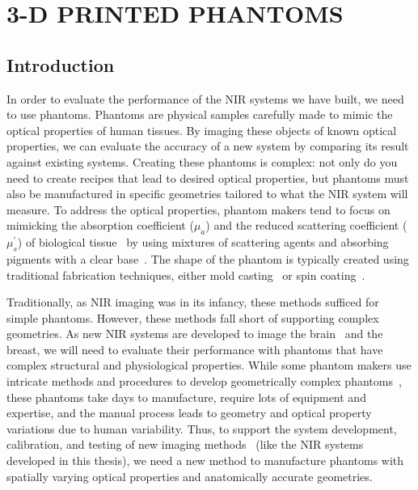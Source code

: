 
\chapter{3-D PRINTED PHANTOMS} %
\label{chap:3dprint}

\section{Introduction}
In order to evaluate the performance of the \ac{NIR} systems we have built, we need to use phantoms. Phantoms are physical samples carefully made to mimic the optical properties of human tissues\cite{Pogue2006}. By imaging these objects of known optical properties, we can evaluate the accuracy of a new system by comparing its result against existing systems. Creating these phantoms is complex: not only do you need to create recipes that lead to desired optical properties, but phantoms must also be manufactured in specific geometries tailored to what the \ac{NIR} system will measure. To address the optical properties, phantom makers tend to focus on mimicking the absorption coefficient ($\mu_a$) and the reduced scattering coefficient ($\mu_s^{'}$) of biological tissue~\cite{Dempsey2017} by using mixtures of scattering agents and absorbing pigments with a clear base~\cite{Hebden1995, Dong2015}. The shape of the phantom is typically created using traditional fabrication techniques, either mold casting~\cite{Hahn2012} or spin coating~\cite{Park2013}. 

Traditionally, as \ac{NIR} imaging was in its infancy, these methods sufficed for simple phantoms. However, these methods fall short of supporting complex geometries. As new \ac{NIR} systems are developed to image the brain~\cite{Hebden2002, Villringer1997} and the breast, we will need to evaluate their performance with phantoms that have complex structural and physiological properties. While some phantom makers use intricate methods and procedures to develop geometrically complex phantoms~\cite{Mobashsher2014}, these phantoms take days to manufacture, require lots of equipment and expertise, and the manual process leads to  geometry and optical property variations due to human variability. Thus, to support the system development, calibration, and testing of new imaging methods~\cite{Cerussi2012, Diep2015} (like the \ac{NIR} systems developed in this thesis), we need a new method to manufacture phantoms with spatially varying optical properties and anatomically accurate geometries.

